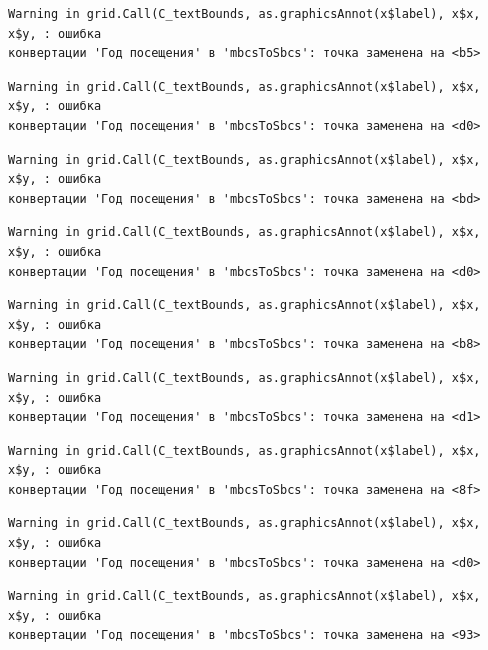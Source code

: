 \documentclass[
  letterpaper,
  DIV=11,
  numbers=noendperiod]{scrreprt}
\begin{document}
\begin{verbatim}
Warning in grid.Call(C_textBounds, as.graphicsAnnot(x$label), x$x, x$y, : ошибка
конвертации 'Год посещения' в 'mbcsToSbcs': точка заменена на <b5>
\end{verbatim}

\begin{verbatim}
Warning in grid.Call(C_textBounds, as.graphicsAnnot(x$label), x$x, x$y, : ошибка
конвертации 'Год посещения' в 'mbcsToSbcs': точка заменена на <d0>
\end{verbatim}

\begin{verbatim}
Warning in grid.Call(C_textBounds, as.graphicsAnnot(x$label), x$x, x$y, : ошибка
конвертации 'Год посещения' в 'mbcsToSbcs': точка заменена на <bd>
\end{verbatim}

\begin{verbatim}
Warning in grid.Call(C_textBounds, as.graphicsAnnot(x$label), x$x, x$y, : ошибка
конвертации 'Год посещения' в 'mbcsToSbcs': точка заменена на <d0>
\end{verbatim}

\begin{verbatim}
Warning in grid.Call(C_textBounds, as.graphicsAnnot(x$label), x$x, x$y, : ошибка
конвертации 'Год посещения' в 'mbcsToSbcs': точка заменена на <b8>
\end{verbatim}

\begin{verbatim}
Warning in grid.Call(C_textBounds, as.graphicsAnnot(x$label), x$x, x$y, : ошибка
конвертации 'Год посещения' в 'mbcsToSbcs': точка заменена на <d1>
\end{verbatim}

\begin{verbatim}
Warning in grid.Call(C_textBounds, as.graphicsAnnot(x$label), x$x, x$y, : ошибка
конвертации 'Год посещения' в 'mbcsToSbcs': точка заменена на <8f>
\end{verbatim}

\begin{verbatim}
Warning in grid.Call(C_textBounds, as.graphicsAnnot(x$label), x$x, x$y, : ошибка
конвертации 'Год посещения' в 'mbcsToSbcs': точка заменена на <d0>
\end{verbatim}

\begin{verbatim}
Warning in grid.Call(C_textBounds, as.graphicsAnnot(x$label), x$x, x$y, : ошибка
конвертации 'Год посещения' в 'mbcsToSbcs': точка заменена на <93>
\end{verbatim}
\end{document}
